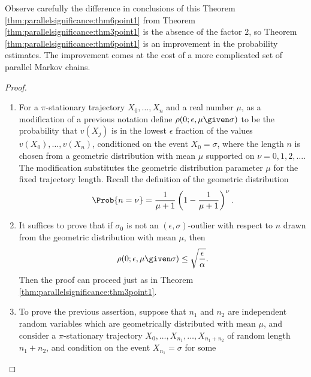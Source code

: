 \documentclass[12pt]{article}
\begin{document}
\begin{remark}
    Observe carefully the difference in conclusions of this Theorem~%
    \ref{thm:parallelsignificance:thm6point1} from Theorem~%
    \ref{thm:parallelsignificance:thm3point1} is the absence of the
    factor \( 2 \), so Theorem~%
    \ref{thm:parallelsignificance:thm6point1} is an improvement in the
    probability estimates.  The improvement comes at the cost of a more
    complicated set of parallel Markov chains.
\end{remark}

\begin{proof}
    \begin{enumerate}
        \item
            For a \( \pi \)-stationary trajectory \( X_0, \dots, X_n \)
            and a real number \( \mu \), as a modification of a previous
            notation define \( \rho(0; \epsilon, \mu \given \sigma) \)
            to be the probability that \( v(X_j) \) is in the lowest \(
            \epsilon \) fraction of the values \( v(X_0), \dots, v(X_n) \),
            conditioned on the event \( X_0 = \sigma \), where the
            length \( n \) is chosen from a geometric distribution with
            mean \( \mu \) supported on \( \nu = 0,1,2,\dots \).  The
            modification substitutes the geometric distribution
            parameter \( \mu \) for the fixed trajectory length.  Recall
            the definition of the geometric distribution
            \[
                \Prob{n = \nu} = \frac{1}{\mu+1}\left( 1 - \frac{1}{\mu+1}
                \right)^\nu.
            \]
        \item
            \label{enum:parallelchain:eq15} It suffices to prove that if
            \( \sigma_0 \) is not an \( (\epsilon, \sigma) \)-outlier
            with respect to \( n \) drawn from the geometric
            distribution with mean \( \mu \), then
            \[
                \rho(0; \epsilon, \mu \given \sigma) \le \sqrt{\frac{\epsilon}
                {\alpha}}.
            \] Then the proof can proceed just as in Theorem~%
            \ref{thm:parallelsignificance:thm3point1}.
        \item
            To prove the previous assertion, suppose that \( n_1 \) and \(
            n_2 \) are independent random variables which are
            geometrically distributed with mean \( \mu \), and consider
            a \( \pi \)-stationary trajectory \( X_0, \dots, X_{n_1},
            \dots, X_{n_1 +n_2} \) of random length \( n_1 + n_2 \), and
            condition on the event \( X_{n_1} = \sigma \) for some

\end{enumerate}
\end{proof}
\end{document}

